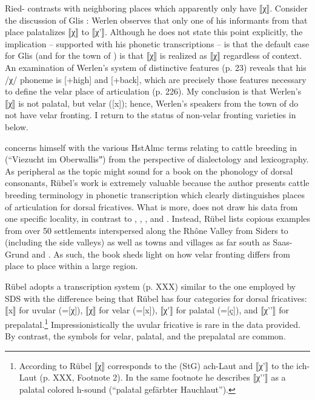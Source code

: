 {Ried- contrasts with neighboring places which apparently only have ⟦χ⟧. Consider the discussion of Glis \citep[338]{Werlen1977}: Werlen observes that only one of his informants from that place palatalizes ⟦χ⟧ to ⟦χ'⟧. Although he does not state this point explicitly, the implication -- supported with his phonetic transcriptions -- is that the default case for Glis (and for the town of ) is that ⟦χ⟧ is realized as ⟦χ⟧ regardless of context. An examination of Werlen’s system of distinctive features (p. 23) reveals that his /χ/ phoneme is [+high] and [+back], which are precisely those features necessary to define the velar place of articulation (p. 226). My conclusion is that Werlen’s ⟦χ⟧ is not palatal, but velar ([x]); hence, Werlen’s speakers from the town of  do not have velar fronting. I return to the status of non-velar fronting varieties in  below.

\citet{Rübel1950} concerns himself with the various HstAlmc terms relating to cattle breeding in  (“Viezucht im Oberwallisˮ) from the perspective of dialectology and lexicography. As peripheral as the topic might sound for a book on the phonology of dorsal consonants, Rübel’s work is extremely valuable because the author presents cattle breeding terminology in phonetic transcription which clearly distinguishes places of articulation for dorsal fricatives. What is more, \citet{Rübel1950} does not draw his data from one specific locality, in contrast to \citet{Wipf1910}, \citet{Henzen1928, Henzen1932}, \citet{Schmid1969}, and \citet{Werlen1977}. Instead, Rübel lists copious examples from over 50 settlements interspersed along the Rhône Valley from Siders to  (including the side valleys) as well as towns and villages as far south as Saas-Grund and . As such, the book sheds light on how velar fronting differs from place to place within a large region.

Rübel adopts a transcription system (p. XXX) similar to the one employed by SDS with the difference being that Rübel has four categories for dorsal fricatives: ⟦x⟧ for uvular (=[χ]), ⟦χ⟧ for velar (=[x]), ⟦χ'⟧ for palatal (=[ç]), and ⟦χ'{}'⟧ for prepalatal.\footnote{{According to Rübel ⟦χ⟧ corresponds to the (StG) ach-Laut and ⟦χ'⟧ to the ich-Laut (p. XXX, Footnote 2). In the same footnote he describes ⟦χ'{}'⟧ as a palatal colored h-sound (“palatal gefärbter Hauchlaut”).}} Impressionistically the uvular fricative is rare in the data provided. By contrast, the symbols for velar, palatal, and the prepalatal are common.\largerpage[-1]

}
